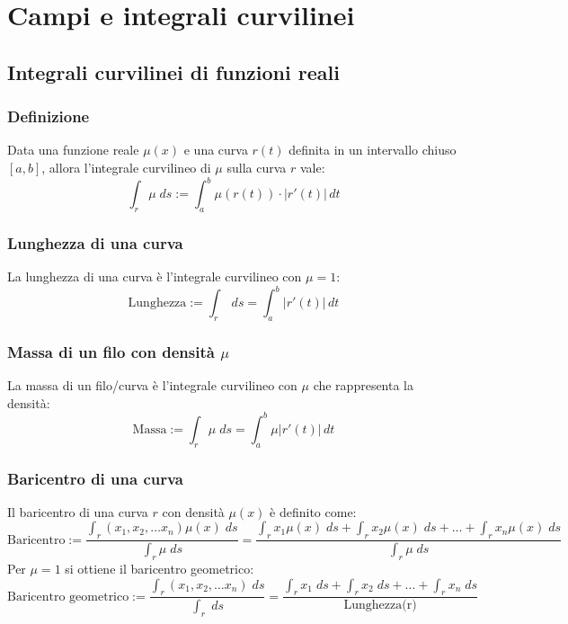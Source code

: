 \documentclass[a4paper]{article}
\begin{document}
\newpage


\section{Campi e integrali curvilinei}
\subsection{Integrali curvilinei di funzioni reali}
\subsubsection*{Definizione}
Data una funzione reale \(\mu(x)\) e una curva \(r(t)\) definita in un intervallo chiuso \([a,b]\), allora l'integrale curvilineo
di \(\mu\) sulla curva \(r\) vale:
\[\int_r \mu \; ds := \int_a^b \mu(r(t)) \cdot \left| r'(t) \right| \, dt\]

\subsubsection*{Lunghezza di una curva}
La lunghezza di una curva è l'integrale curvilineo con \(\mu = 1\):
\[\text{Lunghezza} := \int_r \; ds = \int_a^b \left| r'(t) \right| \, dt\]

\subsubsection*{Massa di un filo con densità \(\mu\)}
La massa di un filo/curva è l'integrale curvilineo con \(\mu\) che rappresenta la densità:
\[\text{Massa} := \int_r \mu \; ds = \int_a^b \mu \left| r'(t) \right| \, dt\]


\subsubsection*{Baricentro di una curva}
Il baricentro di una curva \(r\) con densità \(\mu(x)\) è definito come:
\[\text{Baricentro} := \frac{\displaystyle \int_{r} (x_1, x_2, \dots x_n) \mu(x) \; ds }{\displaystyle \int_r \mu \; ds} = \frac{\displaystyle \int_{r} x_1 \mu(x) \; ds + \int_{r} x_2 \mu(x) \; ds + \dots + \int_{r} x_n \mu(x) \; ds }{\displaystyle \int_r \mu \; ds}\]
Per \(\mu = 1\) si ottiene il baricentro geometrico:
\[\text{Baricentro geometrico} := \frac{\displaystyle \int_{r} (x_1, x_2, \dots x_n) \; ds }{\displaystyle \int_r \; ds} = \frac{\displaystyle \int_{r} x_1 \; ds + \int_{r} x_2 \; ds + \dots + \int_{r} x_n \; ds }{\text{Lunghezza(r)}}\]
\end{document}
